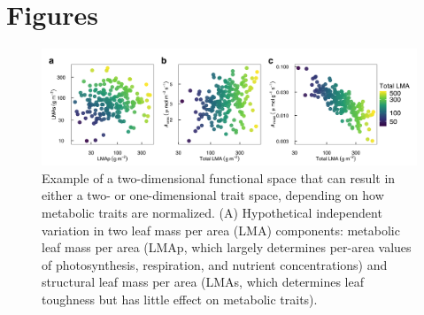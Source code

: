 \documentclass[
  12pt,
  a4paper,
,tablecaptionabove
]{scrartcl}
\providecommand{\DIFaddend}{} %
\providecommand{\DIFaddbeginFL}{} %
\providecommand{\DIFdelbeginFL}{} %
\providecommand{\DIFdelendFL}{} %
\newcommand{\DIFscaledelfig}{0.5}
\newlength{\DIFdelgraphicswidth} %
\newlength{\DIFdelgraphicsheight} %
\newcommand{\DIFaddincludegraphics}[2][]{{\color{blue}\fbox{\DIFOincludegraphics[#1]{#2}}}} %
\newcommand{\DIFdelincludegraphics}[2][]{%
\sbox{\DIFdelgraphicsbox}{\DIFOincludegraphics[#1]{#2}}%
\settoboxwidth{\DIFdelgraphicswidth}{\DIFdelgraphicsbox} %
\settoboxtotalheight{\DIFdelgraphicsheight}{\DIFdelgraphicsbox} %
\scalebox{\DIFscaledelfig}{%
\parbox[b]{\DIFdelgraphicswidth}{\usebox{\DIFdelgraphicsbox}\\[-\baselineskip] \rule{\DIFdelgraphicswidth}{0em}}\llap{\resizebox{\DIFdelgraphicswidth}{\DIFdelgraphicsheight}{%
\setlength{\unitlength}{\DIFdelgraphicswidth}%
\begin{picture}(1,1)%
\thicklines\linethickness{2pt} %
{\color[rgb]{1,0,0}\put(0,0){\framebox(1,1){}}}%
{\color[rgb]{1,0,0}\put(0,0){\line( 1,1){1}}}%
{\color[rgb]{1,0,0}\put(0,1){\line(1,-1){1}}}%
\end{picture}%
}\hspace*{3pt}}} %
} %
\DeclareRobustCommand{\DIFaddend}{\DIFOaddend \let\includegraphics\DIFOincludegraphics} %
\DeclareRobustCommand{\DIFaddbeginFL}{\DIFOaddbeginFL \let\includegraphics\DIFaddincludegraphics} %
\DeclareRobustCommand{\DIFdelbeginFL}{\DIFOdelbeginFL \let\includegraphics\DIFdelincludegraphics} %
\DeclareRobustCommand{\DIFdelendFL}{\DIFOaddendFL \let\includegraphics\DIFOincludegraphics} %
\begin{document}
\newpage

\DIFaddend \hypertarget{figures}{%
\section{Figures}\label{figures}}

\begin{figure}
\DIFdelbeginFL %
\DIFdelendFL \DIFaddbeginFL \hypertarget{fig:Hplt}{%
\centering
\includegraphics{../figs/fig_hypo.png}
\caption{Example of a two-dimensional functional space that can result in either a two- or one-dimensional trait space, depending on how metabolic traits are normalized. (A) Hypothetical independent variation in two leaf mass per area (LMA) components: metabolic leaf mass per area (LMAp, which largely determines per-area values of photosynthesis, respiration, and nutrient concentrations) and structural leaf mass per area (LMAs, which determines leaf toughness but has little effect on metabolic traits).
}}
\end{figure}
\end{document}
